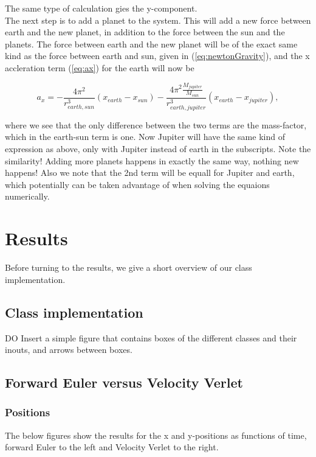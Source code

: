 \documentclass{article}
\begin{document}
The same type of calculation gies the y-component. \\

The next step is to add a planet to the system. This will add a new force between earth and the new planet, in addition to the force between the sun and the planets. The force between earth and the new planet will be of the exact same kind as the force between earth and sun, given in (\ref{eq:newtonGravity}), and the x accleration term (\ref{eq:ax}) for the earth will now be

\begin{equation}\label{eq:3rdPlanet}
a_x = -\frac{4 \pi^2}{r_{earth,sun}^3} (x_{earth}-x_{sun}) - \frac{4 \pi^2 \frac{M_{jupiter}}{M_{sun}}}{r_{earth,jupiter}^3}(x_{earth}-x_{jupiter}),
\end{equation}

where we see that the only difference between the two terms are the mass-factor, which in the earth-sun term is one. Now Jupiter will have the same kind of expression as above, only with Jupiter instead of earth in the subscripts. Note the similarity! Adding more planets happens in exactly the same way, nothing new happens! Also we note that the 2nd term will be equall for Jupiter and earth, which potentially can be taken advantage of when solving the equaions numerically. 


\section{Results}
Before turning to the results, we give a short overview of our class implementation.

\subsection{Class implementation}
DO Insert a simple figure that contains boxes of the different classes and their inouts, and arrows between boxes.

\subsection{Forward Euler versus Velocity Verlet}

\subsubsection{Positions}
The below figures show the results for the x and y-positions as functions of time, forward Euler to the left and Velocity Verlet to the right. 
\end{document}
